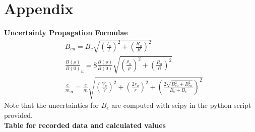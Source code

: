 \documentclass[12pt]{article}
\begin{document}
\section*{Appendix}
{\bf Uncertainty Propagation Formulae}
\begin{align*}
    &B_{cu}=B_c\sqrt{\left(\frac{I_u}{I}\right)^2+\left(\frac{R_u}{R}\right)^2}\\
    &\frac{B(\rho)}{B(0)}_u=8\frac{B(\rho)}{B(0)}\sqrt{\left(\frac{\rho_u}{\rho}\right)^2+\left(\frac{R_u}{R}\right)^2}\\
    &\frac{e}{m}_u=\frac{e}{m}\sqrt{\left(\frac{V_u}{V}\right)^2+\left(\frac{2r_u}{r}\right)^2+\left(\frac{2\sqrt{B_{cu}^2+B_{eu}^2}}{B_c+B_e}\right)^2}
\end{align*}
Note that the uncertainties for $B_e$ are computed with scipy in the python script provided.\\
{\bf Table for recorded data and calculated values}
\end{document}
